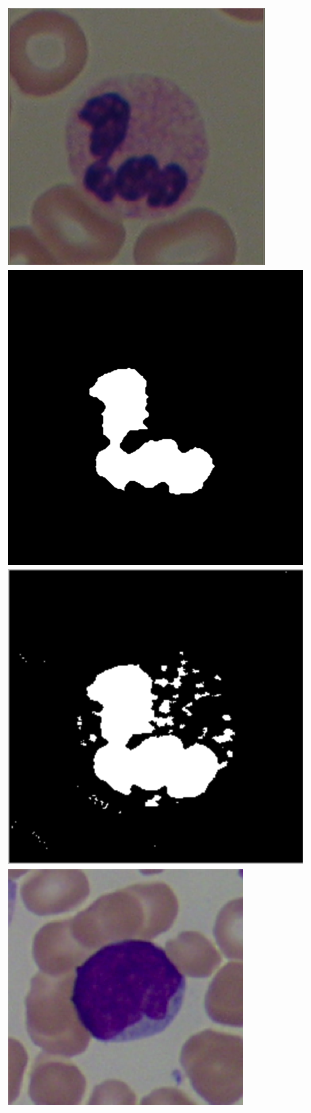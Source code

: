 \documentclass[final,a4paper,12pt,english]{UnicaPhdThesis3}
\begin{document}
\begin{figure}[!b]
	\hspace{1.3mm}\includegraphics[height=0.10\textheight]{images/2015_1_caip/2-1}
	\includegraphics[height=0.10\textheight]{images/2015_1_caip/2-3}
	\includegraphics[height=0.10\textheight]{images/2015_1_caip/2-4}
	\includegraphics[height=0.10\textheight]{images/2015_1_caip/4-1}

\end{figure}
\end{document}
